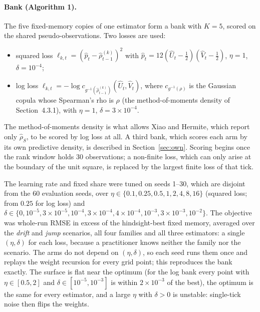\paragraph{Bank (Algorithm 1).} The five fixed-memory copies of one estimator form a bank with
$K=5$, scored on the shared pseudo-observations. Two losses are used:
\begin{itemize}
  \item squared loss $\ell_{k,t}=(\hat p_t-\hat\rho^{(k)}_{t-1})^2$ with
    $\hat p_t=12(\hat U_t-\tfrac12)(\hat V_t-\tfrac12)$, $\eta=1$, $\delta=10^{-4}$;
  \item log loss $\ell_{k,t}=-\log c_{g^{-1}(\hat\rho^{(k)}_{t-1})}(\hat U_t,\hat V_t)$, where
    $c_{g^{-1}(\rho)}$ is the Gaussian copula whose Spearman's rho is $\rho$ (the method-of-moments
    density of Section~4.3.1), with $\eta=1$, $\delta=3\times10^{-4}$.
\end{itemize}
The method-of-moments density is what allows Xiao and Hermite, which report only $\hat\rho_S$, to
be scored by log loss at all. A third bank, which scores each arm by its own predictive density,
is described in Section~\ref{sec:own}. Scoring begins once the rank window holds 30 observations; a
non-finite loss, which can only arise at the boundary of the unit square, is replaced by the
largest finite loss of that tick.

The learning rate and fixed share were tuned on seeds 1--30, which are disjoint from the 60
evaluation seeds, over $\eta\in\{0.1,0.25,0.5,1,2,4,8,16\}$ (squared loss; from $0.25$ for log loss)
and $\delta\in\{0,10^{-5},3\times10^{-5},10^{-4},3\times10^{-4},4\times10^{-4},10^{-3},3\times10^{-3},10^{-2}\}$.
The objective was whole-run RMSE in excess of the hindsight-best fixed memory, averaged over the
\emph{drift} and \emph{jump} scenarios, all four families and all three estimators: a single
$(\eta,\delta)$ for each loss, because a practitioner knows neither the family nor the scenario.
The arms do not depend on $(\eta,\delta)$, so each seed runs them once and replays the weight
recursion for every grid point; this reproduces the bank exactly. The surface is flat near the
optimum (for the log bank every point with $\eta\in[0.5,2]$ and $\delta\in[10^{-5},10^{-3}]$ is within
$2\times10^{-3}$ of the best), the optimum is the same for every estimator, and a large $\eta$ with
$\delta>0$ is unstable: single-tick noise then flips the weights.

